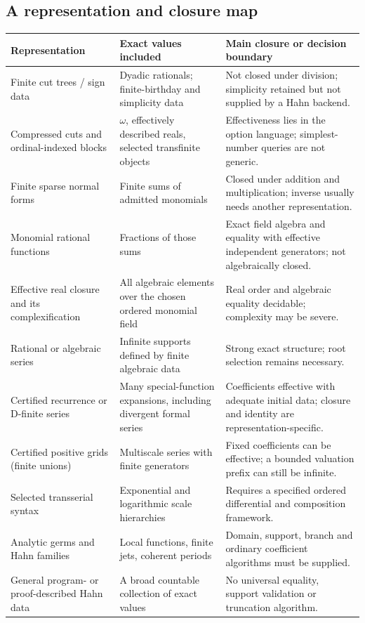 \documentclass[11pt,letterpaper]{article}
\numberwithin{equation}{section}
\theoremstyle{definition}
\theoremstyle{remark}
\begin{document}
\subsection{A representation and closure map}
\label{cas:sub-closuremap}
\begingroup\small
\begin{longtable}{@{}P{0.24\textwidth}P{0.31\textwidth}P{0.37\textwidth}@{}}
\toprule
Representation & Exact values included & Main closure or decision boundary\\
\midrule\endhead
Finite cut trees / sign data & Dyadic rationals; finite-birthday and simplicity
data & Not closed under division; simplicity retained but not supplied by a
Hahn backend.\\[0.45em]
Compressed cuts and ordinal-indexed blocks & $\omega$, effectively described
reals, selected transfinite objects & Effectiveness lies in the option
language; simplest-number queries are not generic.\\[0.45em]
Finite sparse normal forms & Finite sums of admitted monomials & Closed under
addition and multiplication; inverse usually needs another representation.\\[0.45em]
Monomial rational functions & Fractions of those sums & Exact field algebra and
equality with effective independent generators; not algebraically closed.\\[0.45em]
Effective real closure and its complexification & All algebraic elements over
the chosen ordered monomial field & Real order and algebraic equality decidable;
complexity may be severe.\\[0.45em]
Rational or algebraic series & Infinite supports defined by finite algebraic
data & Strong exact structure; root selection remains necessary.\\[0.45em]
Certified recurrence or D-finite series & Many special-function expansions,
including divergent formal series & Coefficients effective with adequate initial
data; closure and identity are representation-specific.\\[0.45em]
Certified positive grids (finite unions) & Multiscale series with finite
generators & Fixed coefficients can be effective; a bounded valuation prefix can
still be infinite.\\[0.45em]
Selected transserial syntax & Exponential and logarithmic scale hierarchies &
Requires a specified ordered differential and composition framework.\\[0.45em]
Analytic germs and Hahn families & Local functions, finite jets, coherent
periods & Domain, support, branch and ordinary coefficient algorithms must be
supplied.\\[0.45em]
General program- or proof-described Hahn data & A broad countable collection of
exact values & No universal equality, support validation or truncation
algorithm.\\
\bottomrule
\end{longtable}
\endgroup
\end{document}

